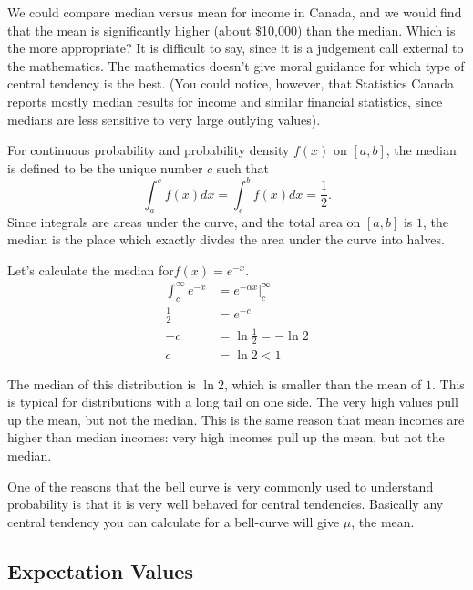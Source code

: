 \documentclass[fleqn]{report}
\begin{document}
We could compare median versus mean for income in
Canada, and we would find that the mean is significantly
higher (about \$10,000) than the median.
Which is the more appropriate? It is difficult to say, since
it is a judgement call external to the mathematics. The
mathematics doesn't give moral guidance for which type of
central tendency is the best. (You could notice, however,
that Statistics Canada reports mostly median results for
income and similar financial statistics, since medians are
less sensitive to very large outlying values).

\begin{defn}
For continuous probability and probability density $f(x)$ on
$[a,b]$, the median is defined to be the unique number $c$
such that
\begin{equation*}
\int_a^c f(x) dx = \int_c^b f(x) dx = \frac{1}{2}.
\end{equation*}
Since integrals are areas under the curve, and the total area
on $[a,b]$ is $1$, the median is the place which exactly
divdes the area under the curve into halves.
\end{defn}

\begin{example}
Let's calculate the median for$f(x) = e^{-x}$.
\begin{align*}
\int_c^\infty e^{-x} & = \left. e^{-\alpha x}\right|_c^\infty \\
\frac{1}{2} & = e^{-c} \\
-c & = \ln \frac{1}{2} = - \ln 2 \\
c & = \ln 2 < 1
\end{align*}

The median of this distribution is $\ln 2$, which is smaller
than the mean of $1$. This is typical for distributions
with a long tail on one side. The very high values pull up
the mean, but not the median. This is the same reason that
mean incomes are higher than median incomes: very high
incomes pull up the mean, but not the median.
\end{example}

One of the reasons that the bell curve is very commonly used
to understand probability is that it is very well behaved for
central tendencies. Basically any central tendency you can
calculate for a bell-curve will give $\mu$, the mean.

\subsection{Expectation Values}
\label{expectation-values}
\end{document}
